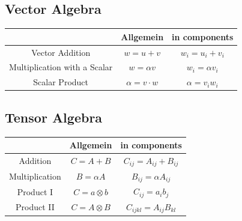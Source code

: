 \documentclass[a4paper, 10pt]{scrartcl}
\begin{document}
	
	\subsection{Vector Algebra}
	\begin{tabular}{|c|c|c|}
		\hline  & Allgemein & in components \\ 
		\hline Vector Addition & $w=u+v$ & $w_i=u_i+v_i$ \\ 
		\hline Multiplication with a Scalar & $w=\alpha v$ & $w_i=\alpha v_i$ \\ 
		\hline Scalar Product & $\alpha = v \cdot w $ & $\alpha = v_i w_i$ \\ 
		\hline 
	\end{tabular} 
	
	\subsection{Tensor Algebra}
	\begin{tabular}{|c|c|c|}
		\hline  & Allgemein & in components \\ 
		\hline Addition & $C=A+B$ & $C_{ij}=A_{ij}+B_{ij}$ \\ 
		\hline Multiplication& $B=\alpha A$ & $B_{ij}=\alpha A_{ij}$ \\ 
		\hline Product I & $C = a \otimes b $ & $C_{ij} = a_i b_j$ \\ 
		\hline Product II& $C = A \otimes B $ & $C_{ijkl} = A_{ij} B_{kl}$ \\
		\hline 
	\end{tabular} 
	
\end{document}
